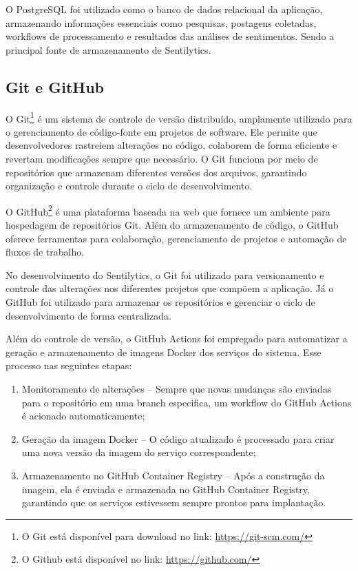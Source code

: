 \documentclass[
	12pt,				%
	oneside,			%
	a4paper,			%
	english,			%
	french,				%
	spanish,			%
	brazil				%
	]{abntex2}
\begin{document}
O PostgreSQL foi utilizado como o banco de dados relacional da
aplicação, armazenando informações essenciais como pesquisas, postagens
coletadas, workflows de processamento e resultados das análises de
sentimentos. Sendo a principal fonte de armazenamento de Sentilytics.

\hypertarget{git-e-github}{%
\subsection{Git e GitHub}\label{git-e-github}}

O Git\footnote{O Git está disponível para download no link:
  \url{https://git-scm.com/}} é um sistema de controle de versão
distribuído, amplamente utilizado para o gerenciamento de código-fonte
em projetos de software. Ele permite que desenvolvedores rastreiem
alterações no código, colaborem de forma eficiente e revertam
modificações sempre que necessário. O Git funciona por meio de
repositórios que armazenam diferentes versões dos arquivos, garantindo
organização e controle durante o ciclo de desenvolvimento.

O GitHub\footnote{O Github está disponível no link:
  \url{https://github.com/}} é uma plataforma baseada na web que fornece
um ambiente para hospedagem de repositórios Git. Além do armazenamento
de código, o GitHub oferece ferramentas para colaboração, gerenciamento
de projetos e automação de fluxos de trabalho.

No desenvolvimento do Sentilytics, o Git foi utilizado para
versionamento e controle das alterações nos diferentes projetos que
compõem a aplicação. Já o GitHub foi utilizado para armazenar os
repositórios e gerenciar o ciclo de desenvolvimento de forma
centralizada.

Além do controle de versão, o GitHub Actions foi empregado para
automatizar a geração e armazenamento de imagens Docker dos serviços do
sistema. Esse processo nas seguintes etapas:

\begin{enumerate}
\def\labelenumi{\arabic{enumi})}
\tightlist
\item
  Monitoramento de alterações -- Sempre que novas mudanças são enviadas
  para o repositório em uma branch especifica, um workflow do GitHub
  Actions é acionado automaticamente;
\item
  Geração da imagem Docker -- O código atualizado é processado para
  criar uma nova versão da imagem do serviço correspondente;
\item
  Armazenamento no GitHub Container Registry -- Após a construção da
  imagem, ela é enviada e armazenada no GitHub Container Registry,
  garantindo que os serviços estivessem sempre prontos para implantação.
\end{enumerate}
\end{document}
